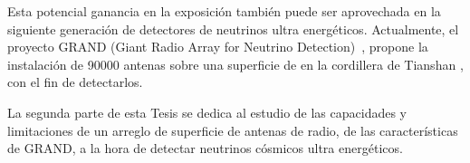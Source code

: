 Esta potencial ganancia en la exposici\'on tambi\'en puede ser aprovechada en la siguiente generaci\'on de detectores de neutrinos ultra energ\'eticos. 
Actualmente, el proyecto GRAND (Giant Radio Array for Neutrino Detection)~\cite{cite:grand_prop}, propone la instalaci\'on de 90000 antenas sobre una superficie de  en la cordillera de Tianshan \cite{cite:grand_tec}, con el fin de detectarlos.

La segunda parte de esta Tesis se dedica al estudio de las capacidades y limitaciones de un arreglo de superficie de antenas de radio, de las caracter\'isticas de GRAND, a la hora de detectar neutrinos cósmicos ultra energéticos.

